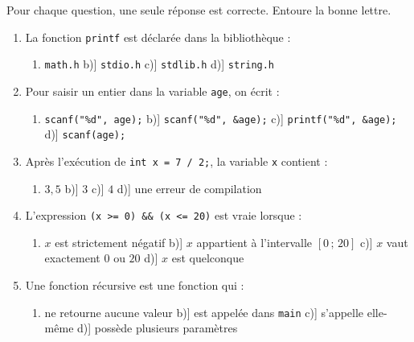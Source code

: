 \documentclass[11pt]{article}
\begin{document}
\begin{exercice}
Pour chaque question, une seule réponse est correcte. Entoure la bonne lettre.
\begin{enumerate}
\item La fonction \texttt{printf} est déclarée dans la bibliothèque :
\begin{enumerate}
\item[a)] \texttt{math.h} \quad b)] \texttt{stdio.h} \quad c)] \texttt{stdlib.h} \quad d)] \texttt{string.h}
\end{enumerate}
\item Pour saisir un entier dans la variable \texttt{age}, on écrit :
\begin{enumerate}
\item[a)] \texttt{scanf("\%d", age);} \quad b)] \texttt{scanf("\%d", \&age);} \quad c)] \texttt{printf("\%d", \&age);} \quad d)] \texttt{scanf(age);}
\end{enumerate}
\item Après l'exécution de \texttt{int x = 7 / 2;}, la variable \texttt{x} contient :
\begin{enumerate}
\item[a)] $3,5$ \quad b)] $3$ \quad c)] $4$ \quad d)] une erreur de compilation
\end{enumerate}
\item L'expression \texttt{(x >= 0) \&\& (x <= 20)} est vraie lorsque :
\begin{enumerate}
\item[a)] $x$ est strictement négatif \quad b)] $x$ appartient à l'intervalle $[0\,;\,20]$ \quad c)] $x$ vaut exactement $0$ ou $20$ \quad d)] $x$ est quelconque
\end{enumerate}
\item Une fonction récursive est une fonction qui :
\begin{enumerate}
\item[a)] ne retourne aucune valeur \quad b)] est appelée dans \texttt{main} \quad c)] s'appelle elle-même \quad d)] possède plusieurs paramètres
\end{enumerate}
\end{enumerate}
\end{exercice}
\end{document}
